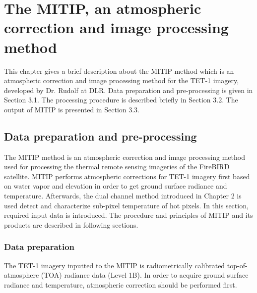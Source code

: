 \chapter{The MITIP, an atmospheric correction and image processing method}

\label{Chapter3}

This chapter gives a brief description about the MITIP method which is an atmospheric correction and image processing method for the TET-1 imagery, developed by Dr. Rudolf at DLR. Data preparation and pre-processing is given in Section 3.1. The processing procedure is described briefly in Section 3.2. The output of MITIP is presented in Section 3.3.\\


\section{Data preparation and pre-processing}
The MITIP method is an atmospheric correction and image processing method used for processing the thermal remote sensing imageries of the FireBIRD satellite. MITIP performs atmospheric corrections for TET-1 imagery first based on water vapor and elevation in order to get ground surface radiance and temperature. Afterwards, the dual channel method introduced in Chapter 2 is used detect and characterize sub-pixel temperature of hot pixels. In this section, required input data is introduced. The procedure and principles of MITIP and its products are described in following sections.\\


\subsection{Data preparation}
The TET-1 imagery inputted to the MITIP is radiometrically calibrated top-of-atmosphere (TOA) radiance data (Level 1B). In order to acquire ground surface radiance and temperature, atmospheric correction should be performed first.\\

